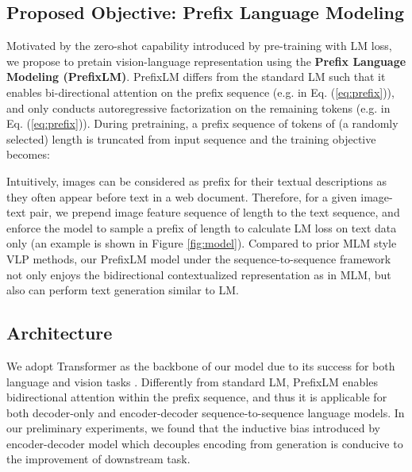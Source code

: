 \documentclass{article} \usepackage{iclr2022_conference,times}
\begin{document}
\subsection{Proposed Objective: Prefix Language Modeling}

Motivated by the zero-shot capability introduced by pre-training with LM loss,
we propose to pretain vision-language representation using 
the \textbf{Prefix Language Modeling (PrefixLM)}.
PrefixLM differs from the standard LM such that
it enables bi-directional attention on the prefix sequence (e.g.  in Eq. (\ref{eq:prefix})),
and only conducts autoregressive factorization on the remaining tokens (e.g.  in Eq. (\ref{eq:prefix})).
During pretraining,
a prefix sequence of tokens of (a randomly selected) length  is truncated from input sequence
and the training objective becomes:

Intuitively, images can be considered as prefix for their textual descriptions as they often appear before text in a web document.
Therefore, for a given image-text pair,
we prepend image feature sequence of length  to the text sequence, and enforce the model to sample a prefix of length  to calculate LM loss on text data only (an example is shown in Figure \ref{fig:model}).
Compared to prior MLM style VLP methods,
our PrefixLM model under the sequence-to-sequence framework not only enjoys the bidirectional contextualized representation as in MLM,
but also can perform text generation similar to LM.



\subsection{Architecture}

We adopt Transformer as the backbone of our model due to its success for both language and vision tasks \citep{devlin2018bert,dosovitskiy2021an}.
Differently from standard LM, PrefixLM enables bidirectional attention within the prefix sequence,
and thus it is applicable for both decoder-only and encoder-decoder sequence-to-sequence language models.
In our preliminary experiments,
we found that the inductive bias introduced by encoder-decoder model which decouples encoding from generation is conducive to the improvement of downstream task.
\end{document}
